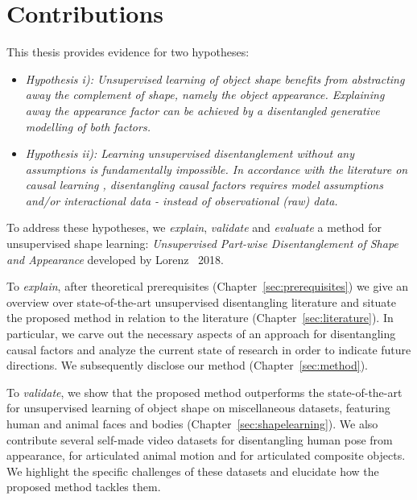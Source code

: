 \section{Contributions}\label{sec:contributions}
	This thesis provides evidence for two hypotheses:
	\begin{itemize}
		\item  \textit{Hypothesis \emph{i)}: Unsupervised learning of object shape benefits from abstracting away the complement of shape, namely the object appearance. Explaining away the appearance factor can be achieved by a disentangled generative modelling of both factors.}
		\item \textit{Hypothesis \emph{ii)}: Learning unsupervised disentanglement without any assumptions is fundamentally impossible. In accordance with the literature on causal learning \cite{pearl18impediments}, disentangling causal factors requires model assumptions and/or interactional data - instead of observational (raw) data.}
	\end{itemize}
	To address these hypotheses, we \textit{explain}, \textit{validate} and \textit{evaluate} a method for unsupervised shape learning: \textit{Unsupervised Part-wise Disentanglement of Shape and Appearance} developed by Lorenz \etal\ 2018.


	To \textit{explain}, after theoretical prerequisites (Chapter~\ref{sec:prerequisites}) we give an overview over state-of-the-art unsupervised disentangling literature and situate the proposed method in relation to the literature (Chapter~\ref{sec:literature}). In particular, we carve out the necessary aspects of an approach for disentangling causal factors and analyze the current state of research in order to indicate future directions.
	We subsequently disclose our method (Chapter~\ref{sec:method}).


	To \textit{validate}, we show that the proposed method outperforms the state-of-the-art for unsupervised learning of object shape on miscellaneous datasets, featuring human and animal faces and bodies (Chapter~\ref{sec:shapelearning}).
	We also contribute several self-made video datasets for disentangling human pose from appearance, for articulated animal motion and for articulated composite objects. We highlight the specific challenges of these datasets and elucidate how the proposed method tackles them.


